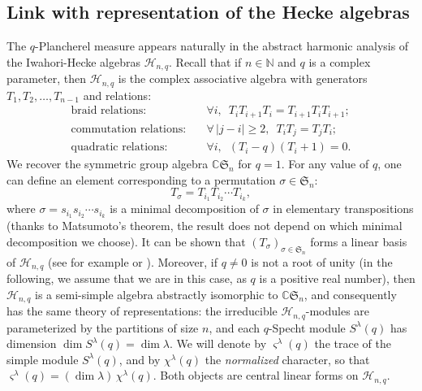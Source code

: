 \documentclass[10pt]{amsart}
\theoremstyle{remark}
\newcommand{\N}{\mathbb{N}}
\newcommand{\C}{\mathbb{C}}
\newcommand{\IH}{\mathscr{H}}
\newcommand{\sym}{\mathfrak{S}}
\begin{document}
\subsection{Link with representation of the Hecke algebras}\label{subsect:qPlancherel_trace}
The $q$-Plancherel measure appears naturally in the abstract harmonic analysis of the Iwahori-Hecke algebras $\IH_{n,q}$. Recall that if $n \in \N$ and $q$ is a complex parameter, then $\IH_{n,q}$ is the complex associative algebra with generators $T_1,T_2,\ldots,T_{n-1}$ and relations:
\begin{align*}
 \text{braid relations:}&\quad  \forall i,\,\,\,T_iT_{i+1}T_i=T_{i+1}T_iT_{i+1} ;\\
\text{commutation relations:}&\quad \forall\, |j-i|\geq 2,\,\,\,T_iT_j=T_jT_i ;\\
\text{quadratic relations:}&\quad  \forall i,\,\,\,(T_i-q)(T_i+1)=0.
\end{align*}
We recover the symmetric group algebra $\C\sym_n$ for $q=1$. For any value of $q$, one can define an element corresponding to a permutation $\sigma \in \sym_n$:
$$T_\sigma=T_{i_1}T_{i_2}\cdots T_{i_k}, $$
where $\sigma=s_{i_1}s_{i_2}\cdots s_{i_k}$ is a minimal decomposition of $\sigma$ in elementary transpositions (thanks to Matsumoto's theorem, the result does not depend on which minimal decomposition we choose). It can be shown that $(T_\sigma)_{\sigma \in \sym_n}$ forms a linear basis of $\IH_{n,q}$ (see for example \cite{Mat99} or \cite{GP00}). Moreover, if $q \neq 0$ is not a root of unity (in the following, we assume that we are in this case, as $q$ is a positive real number), then $\IH_{n,q}$ is a semi-simple algebra abstractly isomorphic to $\C\sym_n$, and consequently has the same theory of representations: the irreducible $\IH_{n,q}$-modules are parameterized by the partitions of size $n$, and each $q$-Specht module $S^\lambda(q)$ has dimension $\dim S^\lambda(q)=\dim \lambda$. We will denote by $\varsigma^\lambda(q)$ the trace of the simple module $S^\lambda(q)$, and by $\chi^{\lambda}(q)$  the \emph{normalized} character, so that $\varsigma^\lambda(q)=(\dim \lambda)\,\chi^\lambda(q)$. Both objects are central linear forms on $\IH_{n,q}$.\bigskip
\end{document}
